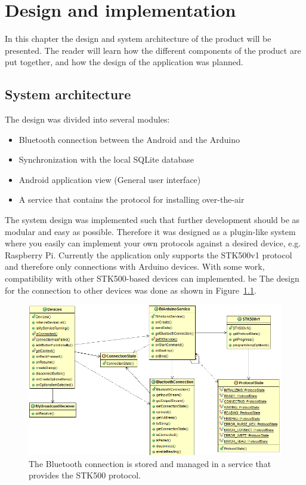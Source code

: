 \chapter{Design and implementation}
In this chapter the design and system architecture of the product will be presented. The reader will learn how the different components of the product are put together, and how the design of the application was planned.

\section{System architecture}
	The design was divided into several modules:
	\begin{itemize}
		\item{Bluetooth connection between the Android and the Arduino}
		\item{Synchronization with the local SQLite database}
		\item{Android application view (General user interface)}
		\item{A service that contains the protocol for installing over-the-air}
	\end{itemize}
	\vspace{0.2in}
	
	The system design was implemented such that further development should be as modular and easy as possible. Therefore it was designed as a plugin-like system where you easily can implement your own protocols against a desired device, e.g. Raspberry Pi. Currently the application only supports the STK500v1 protocol and therefore only connections with Arduino devices. With some work, compatibility with other STK500-based devices can implemented. be The design for the connection to other devices was done as shown in Figure~\ref{fig:btconnection_service_stk500}.\\

	\begin{figure}[H]
	\centering
	\hspace*{-0.75in}
	\includegraphics[scale=0.85]{images/UML/btconnection_service_stk500.png}
	\caption[BT connection in service]{The Bluetooth connection is stored and managed in a service that provides the STK500 protocol.}
	\label{fig:btconnection_service_stk500}
	\end{figure}

